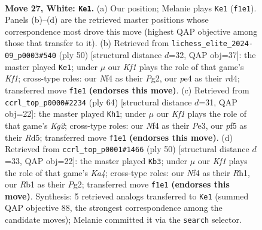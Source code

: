 \documentclass[11pt]{article}
\begin{document}
\clearpage

\begin{figure}[p]\centering
\begin{subfigure}{0.46\textwidth}\centering
\resizebox{\linewidth}{!}{%
\newchessgame
\chessboard[
  setfen={7R/pppk4/8/5p2/4pN2/8/PPrr1P1P/1R3K2 w - - 6 27},
  showmover=false,
  pgfstyle=straightmove, color=movearrow, markmove={f1-e1}
]}
\caption{}
\end{subfigure}\hfill
\begin{subfigure}{0.46\textwidth}\centering
\resizebox{\linewidth}{!}{%
\newchessgame
\chessboard[
  setfen={6k1/5pp1/p7/1pR1P2p/3r4/8/PP1r1PPP/1R3K2 w - - 4 26},
  showmover=false,
  pgfstyle=straightmove, color=movearrow, markmove={f1-e1}
]}
\caption{}
\end{subfigure}
\\[4pt]
\begin{subfigure}{0.46\textwidth}\centering
\resizebox{\linewidth}{!}{%
\newchessgame
\chessboard[
  setfen={5r1k/pp4p1/7p/3RPr2/1P6/P3P3/6KP/2R5 w - - 2 33},
  showmover=false,
  pgfstyle=straightmove, color=movearrow, markmove={g2-h1}
]}
\caption{}
\end{subfigure}\hfill
\begin{subfigure}{0.46\textwidth}\centering
\resizebox{\linewidth}{!}{%
\newchessgame
\chessboard[
  setfen={2r3k1/1p2pp1p/8/1R1P1p2/K7/4P3/P1r2PPP/7R w - - 3 26},
  showmover=false,
  pgfstyle=straightmove, color=movearrow, markmove={a4-b3}
]}
\caption{}
\end{subfigure}
\caption{\textbf{Move 27, White: \texttt{Ke1}.} (a) Our position; Melanie plays \texttt{Ke1} (\texttt{f1e1}). Panels (b)--(d) are the retrieved master positions whose correspondence most drove this move (highest QAP objective among those that transfer to it). (b) Retrieved from \texttt{lichess\_elite\_2024-09\_p0003\#540} (ply 50) [structural distance $d$=32, QAP obj=37]: the master played \texttt{Ke1}; under $\mu$ our \emph{Kf1} plays the role of that game's \emph{Kf1}; cross-type roles: our \emph{N}f4 as their \emph{P}g2, our \emph{p}e4 as their \emph{r}d4; transferred move \texttt{f1e1} \textbf{(endorses this move)}. (c) Retrieved from \texttt{ccrl\_top\_p0000\#2234} (ply 64) [structural distance $d$=31, QAP obj=22]: the master played \texttt{Kh1}; under $\mu$ our \emph{Kf1} plays the role of that game's \emph{Kg2}; cross-type roles: our \emph{N}f4 as their \emph{P}e3, our \emph{p}f5 as their \emph{R}d5; transferred move \texttt{f1e1} \textbf{(endorses this move)}. (d) Retrieved from \texttt{ccrl\_top\_p0001\#1466} (ply 50) [structural distance $d$=33, QAP obj=22]: the master played \texttt{Kb3}; under $\mu$ our \emph{Kf1} plays the role of that game's \emph{Ka4}; cross-type roles: our \emph{N}f4 as their \emph{R}h1, our \emph{R}b1 as their \emph{P}g2; transferred move \texttt{f1e1} \textbf{(endorses this move)}. Synthesis: 5 retrieved analogs transferred to \texttt{Ke1} (summed QAP objective 88, the strongest correspondence among the candidate moves); Melanie committed it via the \texttt{search} selector.}
\label{fig:thought-m52}
\end{figure}
\end{document}
